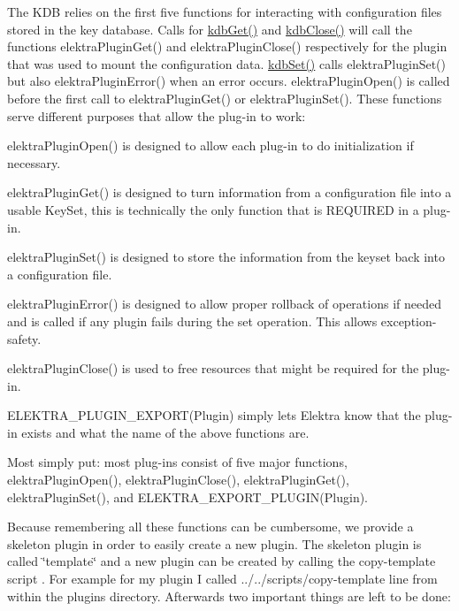 The K\+D\+B relies on the first five functions for interacting with configuration files stored in the key database. Calls for \hyperlink{group__kdb_ga28e385fd9cb7ccfe0b2f1ed2f62453a1}{kdb\+Get()} and \hyperlink{group__kdb_gadb54dc9fda17ee07deb9444df745c96f}{kdb\+Close()} will call the functions elektra\+Plugin\+Get() and elektra\+Plugin\+Close() respectively for the plugin that was used to mount the configuration data. \hyperlink{group__kdb_ga11436b058408f83d303ca5e996832bcf}{kdb\+Set()} calls elektra\+Plugin\+Set() but also elektra\+Plugin\+Error() when an error occurs. elektra\+Plugin\+Open() is called before the first call to elektra\+Plugin\+Get() or elektra\+Plugin\+Set(). These functions serve different purposes that allow the plug-\/in to work\+:


\begin{DoxyItemize}
\item elektra\+Plugin\+Open() is designed to allow each plug-\/in to do initialization if necessary.
\item elektra\+Plugin\+Get() is designed to turn information from a configuration file into a usable Key\+Set, this is technically the only function that is R\+E\+Q\+U\+I\+R\+E\+D in a plug-\/in.
\item elektra\+Plugin\+Set() is designed to store the information from the keyset back into a configuration file.
\item elektra\+Plugin\+Error() is designed to allow proper rollback of operations if needed and is called if any plugin fails during the set operation. This allows exception-\/safety.
\item elektra\+Plugin\+Close() is used to free resources that might be required for the plug-\/in.
\item E\+L\+E\+K\+T\+R\+A\+\_\+\+P\+L\+U\+G\+I\+N\+\_\+\+E\+X\+P\+O\+R\+T(\+Plugin) simply lets Elektra know that the plug-\/in exists and what the name of the above functions are.
\end{DoxyItemize}

Most simply put\+: most plug-\/ins consist of five major functions, {\ttfamily elektra\+Plugin\+Open()}, {\ttfamily elektra\+Plugin\+Close()}, {\ttfamily elektra\+Plugin\+Get()}, {\ttfamily elektra\+Plugin\+Set()}, and {\ttfamily E\+L\+E\+K\+T\+R\+A\+\_\+\+E\+X\+P\+O\+R\+T\+\_\+\+P\+L\+U\+G\+I\+N(\+Plugin)}.

Because remembering all these functions can be cumbersome, we provide a skeleton plugin in order to easily create a new plugin. The skeleton plugin is called \char`\"{}template\char`\"{} and a new plugin can be created by calling the copy-\/template script . For example for my plugin I called {\ttfamily ../../scripts/copy-\/template line} from within the plugins directory. Afterwards two important things are left to be done\+:


